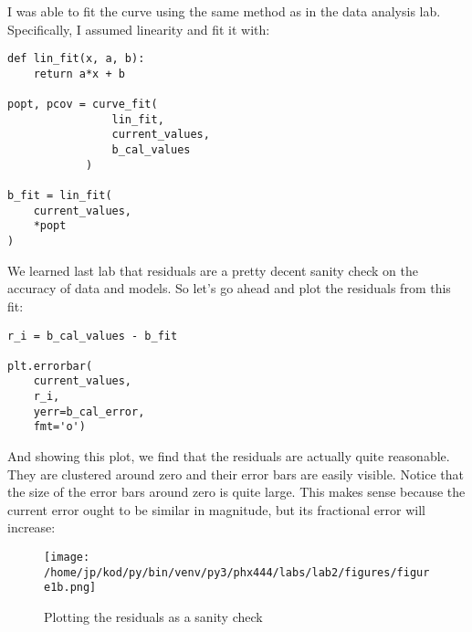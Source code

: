 \documentclass{article}
\begin{document}
I was able to fit the curve using the same method as in the data
analysis lab. Specifically, I assumed linearity and fit it with:

\begin{center}
\begin{minipage}[t]{.75\textwidth}
\begin{lstlisting}[frame=tlrb]
def lin_fit(x, a, b):
    return a*x + b

popt, pcov = curve_fit(
                lin_fit, 
                current_values, 
                b_cal_values
            )

b_fit = lin_fit(
    current_values, 
    *popt
)
\end{lstlisting}
\end{minipage}
\end{center}

We learned last lab that residuals are a pretty decent sanity check on the
accuracy of data and models. So let's go ahead and plot the residuals from this
fit:

\begin{center}
\begin{minipage}[t]{.75\textwidth}
\begin{lstlisting}[frame=tlrb]
r_i = b_cal_values - b_fit

plt.errorbar(
    current_values,
    r_i,
    yerr=b_cal_error,
    fmt='o')
\end{lstlisting}
\end{minipage}
\end{center}

And showing this plot, we find that the residuals are actually quite
reasonable. They are clustered around zero and their error bars are easily
visible. Notice that the size of the error bars around zero is quite large.
This makes sense because the current error ought to be similar in magnitude, but
its fractional error will increase:

\begin{figure}[H]
        \begin{center}
        \texttt{[image: /home/jp/kod/py/bin/venv/py3/phx444/labs/lab2/figures/figure1b.png]}
        \caption{Plotting the residuals as a sanity check}
        \label{fig:fig_2}
        \end{center}
\end{figure}
\end{document}
